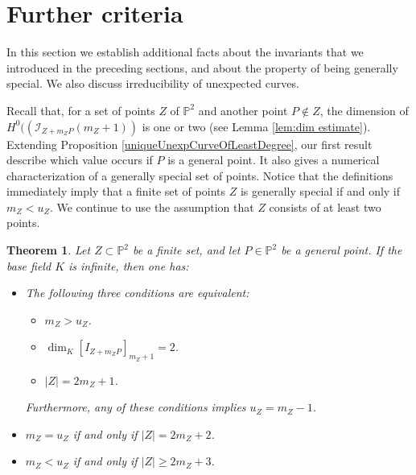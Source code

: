 \documentclass[12pt]{amsart}
\numberwithin{equation}{section}
\newtheorem{theorem}{Theorem}[section]
\theoremstyle{definition}
\begin{document}
\section{Further criteria} 
  \label{sec:criteria}

In this section we establish additional facts about the invariants that we introduced in the preceding sections, and about the property of being generally special.  We also discuss irreducibility of unexpected curves. 

Recall that, for a set of points $Z$ of ${ \ensuremath{\mathbb{P}}}^2$ and another point $P \notin Z$, the dimension of  $H^0((\mathcal I_{Z + m_Z P}(m_Z+1))$ is one or two (see Lemma \ref{lem:dim estimate}).  Extending Proposition \ref{uniqueUnexpCurveOfLeastDegree}, our first result describe which value occurs if $P$ is a general point. It also gives a numerical characterization of a generally special set of points. Notice that the definitions immediately imply that a finite set of points $Z$ is generally special if and only if $m_Z < u_Z$. We continue to use the assumption that $Z$  consists of at least two points. 

\begin{theorem} 
   \label{thm:dim is two}
Let $Z \subset { \ensuremath{\mathbb{P}}}^2$ be a finite set, and let $P \in { \ensuremath{\mathbb{P}}}^2$  be a general point. If the base  field $K$ is infinite, then one has: 
\begin{itemize}
\item[(a)] The following three conditions are equivalent: 
\begin{itemize}
\item[(i)] $m_Z > u_Z$. 

\item[(ii)] $\dim_K [I_{Z + m_Z P}]_{m_Z + 1} = 2$. 

\item[(iii)] $|Z| = 2 m_Z + 1$. 
\end{itemize}

Furthermore, any of these conditions implies $u_Z = m_Z - 1$. 

\item[(b)] $m_Z = u_Z$ if and only if $|Z| = 2 m_Z + 2$. 

\item[(c)] $m_Z <  u_Z$ if and only if $|Z| \ge  2 m_Z + 3$.  
\end{itemize}   
\end{theorem}
\end{document}
